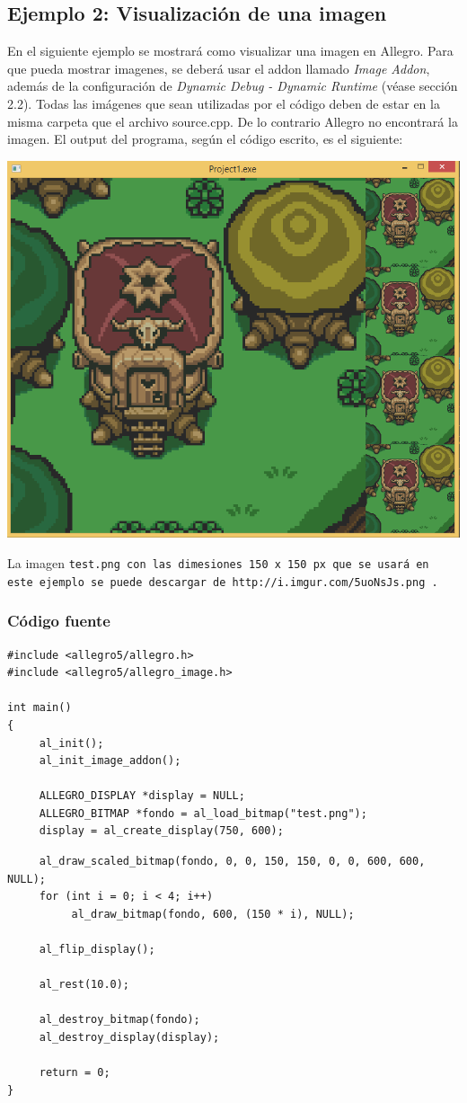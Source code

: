 \documentclass[11pt]{article}
\begin{document}
\subsection{Ejemplo 2:  Visualización de una imagen}
En el siguiente ejemplo se mostrará como visualizar una imagen en Allegro. Para que pueda mostrar imagenes, se deberá usar el addon llamado \emph{Image Addon}, además de la configuración de \emph{Dynamic Debug - Dynamic Runtime} (véase sección 2.2). Todas las imágenes que sean utilizadas por el código deben de estar en la misma carpeta que el archivo source.cpp. De lo contrario Allegro no encontrará la imagen. El output del programa, según el código escrito, es el siguiente:
\begin{center}
\includegraphics[scale=0.3]{SC12.png}
\end{center}
La imagen \tt test.png \rm con las dimesiones 150 x 150 px que se usará en este ejemplo se puede descargar de \tt http://i.imgur.com/5uoNsJs.png \rm .
\subsubsection{Código fuente}
\begin{verbatim}
#include <allegro5/allegro.h>
#include <allegro5/allegro_image.h>

int main() 
{
     al_init();
     al_init_image_addon();
     
     ALLEGRO_DISPLAY *display = NULL;
     ALLEGRO_BITMAP *fondo = al_load_bitmap("test.png");
     display = al_create_display(750, 600);
\end{verbatim}
\pagebreak
\begin{verbatim}
     al_draw_scaled_bitmap(fondo, 0, 0, 150, 150, 0, 0, 600, 600, NULL);
     for (int i = 0; i < 4; i++)
          al_draw_bitmap(fondo, 600, (150 * i), NULL);
      
     al_flip_display();
     
     al_rest(10.0);
     
     al_destroy_bitmap(fondo);
     al_destroy_display(display);
     
     return = 0;
}
\end{verbatim}
\end{document}
